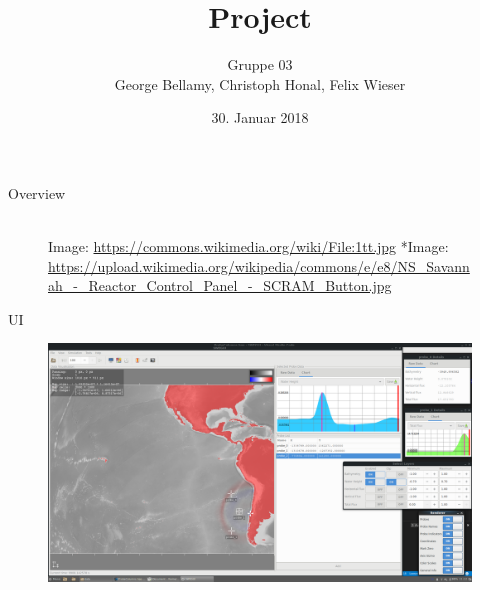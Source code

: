 \documentclass[shortpres,usenames,dvipsnames]{beamer}
\title[{Tsunami simulation}]{Project}
\author[Bellamy, Honal, Wieser]{Gruppe 03\\George Bellamy, Christoph Honal, Felix Wieser\\\vspace{10pt}{\small Bachelorpraktikum}}
\institute[TU M\"unchen]{Technical University of Munich}
\date{30. Januar 2018}
\begin{document}
		\maketitle
		
		
\begin{frame}{Overview}
	\begin{figure}
		\hspace{20pt}
		\hspace{40pt}\vspace{10pt}\\
		\vfill
		\flushleft
		{\fontsize{5}{5} \selectfont *Image: \url{https://commons.wikimedia.org/wiki/File:1tt.jpg}}
		\flushleft
		{\fontsize{5}{5} \selectfont **Image: \url{https://upload.wikimedia.org/wikipedia/commons/e/e8/NS_Savannah_-_Reactor_Control_Panel_-_SCRAM_Button.jpg}}
	\end{figure}
\end{frame}

\begin{frame}[fragile]{UI}
	\begin{figure}
		\includegraphics[clip, width=\linewidth]{img/screenshot_1.png}
	\end{figure}
\end{frame}
\end{document}
